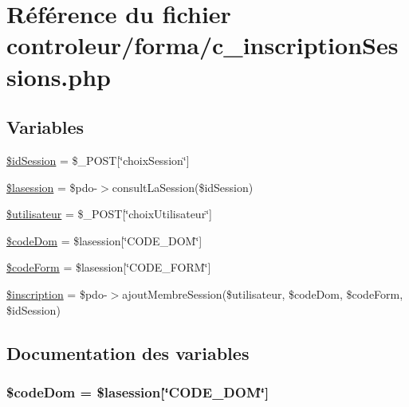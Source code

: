 \hypertarget{c__inscription_sessions_8php}{}\section{Référence du fichier controleur/forma/c\+\_\+inscription\+Sessions.php}
\label{c__inscription_sessions_8php}
\subsection*{Variables}
\begin{DoxyCompactItemize}
\item 
\hyperlink{c__inscription_sessions_8php_a6ef1232ae13c14eb925618d8c0e4b4ab}{\$id\+Session} = \$\+\_\+\+P\+O\+ST\mbox{[}\char`\"{}choix\+Session\char`\"{}\mbox{]}
\item 
\hyperlink{c__inscription_sessions_8php_a380af04e3eb99fecc30ece89820d38c4}{\$lasession} = \$pdo-\/$>$consult\+La\+Session(\$id\+Session)
\item 
\hyperlink{c__inscription_sessions_8php_a828de823fdd02f321434f4233e53793b}{\$utilisateur} = \$\+\_\+\+P\+O\+ST\mbox{[}\char`\"{}choix\+Utilisateur\char`\"{}\mbox{]}
\item 
\hyperlink{c__inscription_sessions_8php_ae94720cda909da18d520a8f88215126c}{\$code\+Dom} = \$lasession\mbox{[}\char`\"{}C\+O\+D\+E\+\_\+\+D\+OM\char`\"{}\mbox{]}
\item 
\hyperlink{c__inscription_sessions_8php_a21a7519d367570012a45d1d104d03556}{\$code\+Form} = \$lasession\mbox{[}\char`\"{}C\+O\+D\+E\+\_\+\+F\+O\+RM\char`\"{}\mbox{]}
\item 
\hyperlink{c__inscription_sessions_8php_a273e381bb67c864cacd25da3581acb82}{\$inscription} = \$pdo-\/$>$ajout\+Membre\+Session(\$utilisateur, \$code\+Dom, \$code\+Form, \$id\+Session)
\end{DoxyCompactItemize}


\subsection{Documentation des variables}
\subsubsection[{\texorpdfstring{\$code\+Dom}{$codeDom}}]{\setlength{\rightskip}{0pt plus 5cm}\$code\+Dom = \$lasession\mbox{[}\char`\"{}C\+O\+D\+E\+\_\+\+D\+OM\char`\"{}\mbox{]}}\hypertarget{c__inscription_sessions_8php_ae94720cda909da18d520a8f88215126c}{}\label{c__inscription_sessions_8php_ae94720cda909da18d520a8f88215126c}


